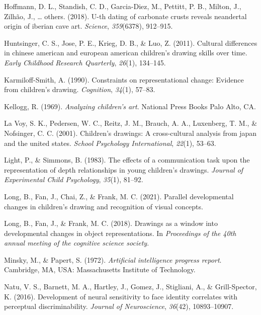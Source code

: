 \documentclass[
  english,
  man]{apa6}
\begin{document}
\leavevmode\hypertarget{ref-hoffmann2018u}{}%
Hoffmann, D. L., Standish, C. D., Garcia-Diez, M., Pettitt, P. B., Milton, J., Zilhão, J., \ldots{} others. (2018). U-th dating of carbonate crusts reveals neandertal origin of iberian cave art. \emph{Science}, \emph{359}(6378), 912--915.

\leavevmode\hypertarget{ref-huntsinger2011cultural}{}%
Huntsinger, C. S., Jose, P. E., Krieg, D. B., \& Luo, Z. (2011). Cultural differences in chinese american and european american children's drawing skills over time. \emph{Early Childhood Research Quarterly}, \emph{26}(1), 134--145.

\leavevmode\hypertarget{ref-karmiloff1990constraints}{}%
Karmiloff-Smith, A. (1990). Constraints on representational change: Evidence from children's drawing. \emph{Cognition}, \emph{34}(1), 57--83.

\leavevmode\hypertarget{ref-kellogg1969analyzing}{}%
Kellogg, R. (1969). \emph{Analyzing children's art}. National Press Books Palo Alto, CA.

\leavevmode\hypertarget{ref-la2001children}{}%
La Voy, S. K., Pedersen, W. C., Reitz, J. M., Brauch, A. A., Luxenberg, T. M., \& Nofsinger, C. C. (2001). Children's drawings: A cross-cultural analysis from japan and the united states. \emph{School Psychology International}, \emph{22}(1), 53--63.

\leavevmode\hypertarget{ref-light1983effects}{}%
Light, P., \& Simmons, B. (1983). The effects of a communication task upon the representation of depth relationships in young children's drawings. \emph{Journal of Experimental Child Psychology}, \emph{35}(1), 81--92.

\leavevmode\hypertarget{ref-long2021parallel}{}%
Long, B., Fan, J., Chai, Z., \& Frank, M. C. (2021). Parallel developmental changes in children's drawing and recognition of visual concepts.

\leavevmode\hypertarget{ref-long2018drawings}{}%
Long, B., Fan, J., \& Frank, M. C. (2018). Drawings as a window into developmental changes in object representations. In \emph{Proceedings of the 40th annual meeting of the cognitive science society}.

\leavevmode\hypertarget{ref-minsky1972artificial}{}%
Minsky, M., \& Papert, S. (1972). \emph{Artificial intelligence progress report}. Cambridge, MA, USA: Massachusetts Institute of Technology.

\leavevmode\hypertarget{ref-natu2016development}{}%
Natu, V. S., Barnett, M. A., Hartley, J., Gomez, J., Stigliani, A., \& Grill-Spector, K. (2016). Development of neural sensitivity to face identity correlates with perceptual discriminability. \emph{Journal of Neuroscience}, \emph{36}(42), 10893--10907.
\end{document}
